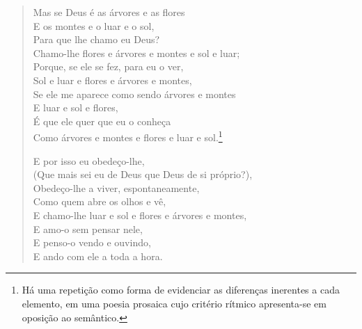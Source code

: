 \begin{verse}
Mas se Deus é as árvores e as flores \\
E os montes e o luar e o sol, \\
Para que lhe chamo eu Deus? \\
Chamo-lhe flores e árvores e montes e sol e luar; \\
Porque, se ele se fez, para eu o ver, \\
Sol e luar e flores e árvores e montes, \\
Se ele me aparece como sendo árvores e montes \\
E luar e sol e flores, \\
É que ele quer que eu o conheça \\
Como árvores e montes e flores e luar e sol.\footnote{Há uma repetição como forma de evidenciar as diferenças inerentes a cada elemento, em uma poesia prosaica cujo critério rítmico apresenta-se em oposição ao semântico.}

E por isso eu obedeço-lhe, \\
(Que mais sei eu de Deus que Deus de si próprio?), \\
Obedeço-lhe a viver, espontaneamente, \\
Como quem abre os olhos e vê, \\
E chamo-lhe luar e sol e flores e árvores e montes, \\
E amo-o sem pensar nele, \\
E penso-o vendo e ouvindo, \\
E ando com ele a toda a hora.
\end{verse}

